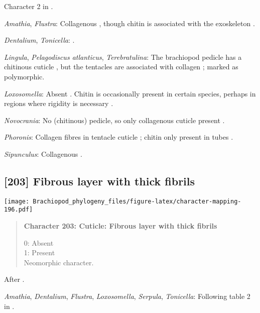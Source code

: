 \documentclass[openany]{book}
\theoremstyle{definition}
\theoremstyle{definition}
\theoremstyle{definition}
\theoremstyle{remark}
\begin{document}
Character 2 in \citet{Haszprunar2008}.

\hypertarget{Amathia-coding-202}{}
\emph{Amathia}, \emph{Flustra}: Collagenous \citep{Schopf1967}, though
chitin is associated with the exoskeleton \citep{Hunt1972}.

\hypertarget{Dentalium-coding-202}{}
\emph{Dentalium}, \emph{Tonicella}: \citet{Haszprunar2008}.

\hypertarget{Lingula-coding-202}{}
\emph{Lingula}, \emph{Pelagodiscus atlanticus}, \emph{Terebratulina}:
The brachiopod pedicle has a chitinous cuticle
\citep{Williams1997Introduction, MacKay1978}, but the tentacles are
associated with collagen \citep{Williams1997Introduction}; marked as
polymorphic.

\hypertarget{Loxosomella-coding-202}{}
\emph{Loxosomella}: Absent \citep{Haszprunar2008}. Chitin is
occasionally present in certain species, perhaps in regions where
rigidity is necessary \citep{Borisanova2015}.

\hypertarget{Novocrania-coding-202}{}
\emph{Novocrania}: No (chitinous) pedicle, so only collagenous cuticle
present \citep{Williams1997Introduction}.

\hypertarget{Phoronis-coding-202}{}
\emph{Phoronis}: Collagen fibres in tentacle cuticle
\citep{Bartolomaeus2001U}; chitin only present in tubes
\citep{Jeuniaux1971}.

\hypertarget{Sipunculus-coding-202}{}
\emph{Sipunculus}: Collagenous \citep{Goffinet1978}.

\subsection*{{[}203{]} Fibrous layer with thick
fibrils}\label{fibrous-layer-with-thick-fibrils}

\texttt{[image: Brachiopod\_phylogeny\_files/figure-latex/character-mapping-196.pdf]}

\begin{quote}
\textbf{Character 203: Cuticle: Fibrous layer with thick fibrils}

0: Absent\\
1: Present\\
Neomorphic character.
\end{quote}

After \citet{Borisanova2015}.

\hypertarget{Amathia-coding-203}{}
\emph{Amathia}, \emph{Dentalium}, \emph{Flustra}, \emph{Loxosomella},
\emph{Serpula}, \emph{Tonicella}: Following table 2 in
\citet{Borisanova2015}.
\end{document}
